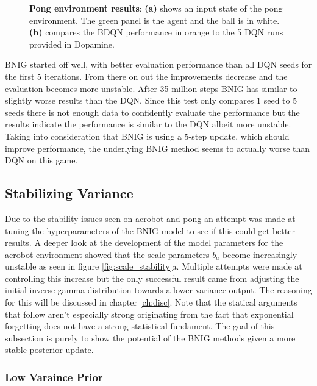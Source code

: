 \begin{figure}[H]
    \caption{\textbf{Pong environment results}: \textbf{(a)} shows an input state of the pong environment\citep{gym_docs}. The green panel is the agent and the ball is in white. \textbf{(b)} compares the BDQN performance in orange to the 5 DQN runs provided in Dopamine.}
    \label{fig:nn_pong}
\end{figure}

BNIG started off well, with better evaluation performance than all DQN seeds for the first 5 iterations. From there on out the improvements decrease and the evaluation becomes more unstable. After 35 million steps BNIG has similar to slightly worse results than the DQN. Since this test only compares 1 seed to 5 seeds there is not enough data to confidently evaluate the performance but the results indicate the performance is similar to the DQN albeit more unstable. Taking into consideration that BNIG is using a 5-step update, which should improve performance, the underlying BNIG method seems to actually worse than DQN on this game.

\subsection{Stabilizing Variance}

Due to the stability issues seen on acrobot and pong an attempt was made at tuning the hyperparameters of the BNIG model to see if this could get better results. A deeper look at the development of the model parameters for the acrobot environment showed that the scale parameters $b_a$ become increasingly unstable as seen in figure \ref{fig:scale_stability}a. Multiple attempts were made at controlling this increase but the only successful result came from adjusting the initial inverse gamma distribution towards a lower variance output. The reasoning for this will be discussed in chapter \ref{ch:disc}. Note that the statical arguments that follow aren't especially strong originating from the fact that exponential forgetting does not have a strong statistical fundament. The goal of this subsection is purely to show the potential of the BNIG methods given a more stable posterior update.  %

\subsubsection{Low Varaince Prior}

